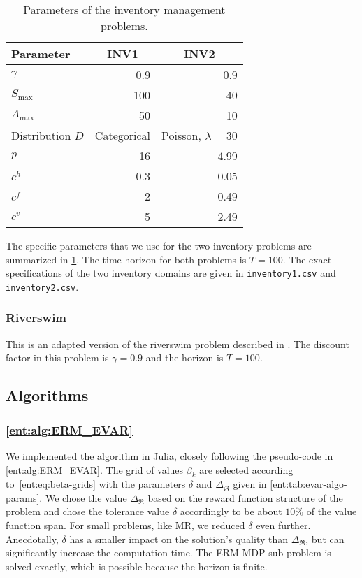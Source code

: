 \documentclass[twoside]{article}
\newcommand{\vspan}{\Delta_{\mathfrak{R}}}
\theoremstyle{plain}
\theoremstyle{definition}
\theoremstyle{remark}
\renewcommand{\cite}[1]{\citep{#1}}
\begin{document}
\begin{table}
  \centering
  \caption{Parameters of the inventory management problems.} \label{ent:tab:inventory-parameters}
  \begin{tabular}{l|rr}
    \toprule
    Parameter & \multicolumn{1}{c}{INV1} & \multicolumn{1}{c}{INV2} \\
    \midrule
    $\gamma$ & 0.9 & 0.9 \\
    $S_{\max}$ & 100 & 40 \\
    $A_{\max}$ & 50 & 10 \\
    Distribution $D$ & Categorical & Poisson, $\lambda = 30$\\
    $p$ & 16 & 4.99 \\
    $c^h$ & 0.3 & 0.05 \\
    $c^f$ & 2 & 0.49 \\
    $c^v$ & 5 & 2.49 \\
    \bottomrule
  \end{tabular}
\end{table}

The specific parameters that we use for the two inventory problems are summarized in \cref{ent:tab:inventory-parameters}. The time horizon for both problems is $T = 100$. The exact specifications of the two inventory domains are given in \texttt{inventory1.csv} and \texttt{inventory2.csv}.

\subsubsection{Riverswim}

This is an adapted version of the riverswim problem described in \cite{Strehl2008model}. The discount factor in this problem is $\gamma = 0.9$ and the horizon is $T = 100$.

\subsection{Algorithms}

\subsubsection{ \cref{ent:alg:ERM_EVAR}}

We implemented the algorithm in Julia, closely following the pseudo-code in \cref{ent:alg:ERM_EVAR}. The grid of values $\beta_k$ are selected according to~\eqref{ent:eq:beta-grids} with the parameters $\delta$ and $\vspan$ given in \cref{ent:tab:evar-algo-params}. We chose the value $\vspan$ based on the reward function structure of the problem and chose the tolerance value $\delta$ accordingly to be about $10\%$ of the value function span. For small problems, like MR, we reduced $\delta$ even further. Anecdotally, $\delta$ has a smaller impact on the solution's quality than $\vspan$, but can significantly increase the computation time. The ERM-MDP sub-problem is solved exactly, which is possible because the horizon is finite. 
\end{document}
